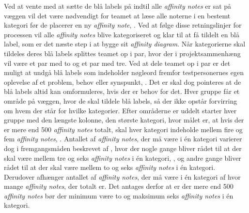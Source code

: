 %
Ved at vente med at sætte de blå labels på indtil alle \textit{affinity notes} er sat på væggen vil det være nødvendigt for teamet at læse alle noterne i en bestemt kategori før de placerer en ny \textit{affinity note}, \parencite[s. 169]{Book:BuildingAnAffinity}. Ved at følge disse retningslinjer for processen vil alle \textit{affinity notes} blive kategoriseret og klar til at få tildelt en blå label, som er det næste step i at bygge sit \textit{affinity diagram}. \blankline
%
Når kategorierne skal tildeles deres blå labels splittes teamet op i par, hvor der i projektsammenhæng vil være et par med to og et par med tre. Ved at dele teamet op i par er det muligt at undgå blå labels som indeholder nøgleord fremfor testpersonernes egen oplevelse af et problem, behov eller synspunkt, \parencite[s. 170]{Book:BuildingAnAffinity}. Det er skal dog pointeres at de blå labels altid kan omformuleres, hvis der er behov for det. Hver gruppe får et område på væggen, hvor de skal tildele blå labels, så der ikke opstår forvirring om hvem der står for hvilke kategorier. Efter områderne er uddelt starter hver gruppe med den længste kolonne, den største kategori, hvor målet er, at hvis der er mere end 500 \textit{affinity notes} totalt, skal hver kategori indeholde mellem fire og fem \textit{affinity notes}, \parencite[s. 170]{Book:BuildingAnAffinity}. Antallet af \textit{affinity notes}, der må være i én kategori varierer dog i fremgangsmåden beskrevet af \textcite[ss. 159-179]{Book:BuildingAnAffinity}, hvor der nogle gange bliver rådet til at der skal være mellem tre og seks \textit{affinity notes} i én kategori, \parencite[s. 167]{Book:BuildingAnAffinity}, og andre gange bliver rådet til at der skal være mellem to og seks \textit{affinity notes} i én kategori. Derudover afhænger antallet af \textit{affinity notes}, der må være i én kategori af hvor mange \textit{affinity notes}, der totalt er. Det antages derfor at er der mere end 500 \textit{affinity notes} bør der minimum være to og maksimum seks \textit{affinity notes} i én kategori. 

